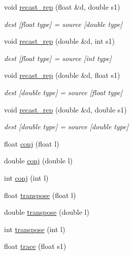\begin{DoxyCompactItemize}
void \mbox{\hyperlink{group__simpleword_gad3aa40e2f2b149a85e571f6c4d757bac}{recast\+\_\+rep}} (float \&d, double s1)
\begin{DoxyCompactList}\small\item\em dest \mbox{[}float type\mbox{]} = source \mbox{[}double type\mbox{]} \end{DoxyCompactList}\item 
void \mbox{\hyperlink{group__simpleword_gada8b742bcffe9ceeb7cc10b48a11a174}{recast\+\_\+rep}} (double \&d, int s1)
\begin{DoxyCompactList}\small\item\em dest \mbox{[}float type\mbox{]} = source \mbox{[}int type\mbox{]} \end{DoxyCompactList}\item 
void \mbox{\hyperlink{group__simpleword_ga78492af33f3095694863918e99ec9d6a}{recast\+\_\+rep}} (double \&d, float s1)
\begin{DoxyCompactList}\small\item\em dest \mbox{[}double type\mbox{]} = source \mbox{[}float type\mbox{]} \end{DoxyCompactList}\item 
void \mbox{\hyperlink{group__simpleword_ga9c4fac4c3903b043a9a31c9036f875f7}{recast\+\_\+rep}} (double \&d, double s1)
\begin{DoxyCompactList}\small\item\em dest \mbox{[}double type\mbox{]} = source \mbox{[}double type\mbox{]} \end{DoxyCompactList}\item 
float \mbox{\hyperlink{group__simpleword_ga1952c9e46ce2b45d95d5bb33e32688c4}{conj}} (float l)
\item 
double \mbox{\hyperlink{group__simpleword_ga321a11547e3d6d0cac59dc6d035e8829}{conj}} (double l)
\item 
int \mbox{\hyperlink{group__simpleword_ga7677ae438b4fb0aa8fd7f9121b9d384b}{conj}} (int l)
\item 
float \mbox{\hyperlink{group__simpleword_gaae1addc48b1db94779e7c31a1a4841fc}{transpose}} (float l)
\item 
double \mbox{\hyperlink{group__simpleword_ga730a338e3cb8cbd8defeefca69e6f665}{transpose}} (double l)
\item 
int \mbox{\hyperlink{group__simpleword_ga7e1346dd429051023361db04dd9b2f27}{transpose}} (int l)
\item 
float \mbox{\hyperlink{group__simpleword_ga374e26c049de5fb2d6fa75fc7658afff}{trace}} (float s1)
\item 

\end{DoxyCompactItemize}
